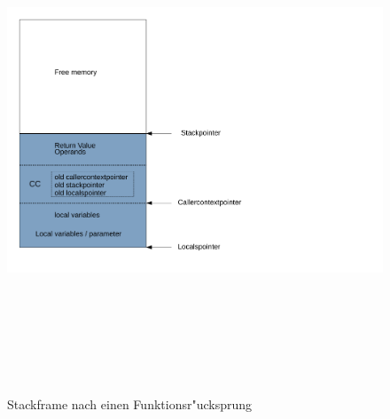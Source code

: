 \begin{figure}
	\centering
	\includegraphics[height = 15cm]{PS_RS_graphics/Stackframe after return.pdf}
	\caption{Stackframe nach einen Funktionsr"ucksprung}
\end{figure}